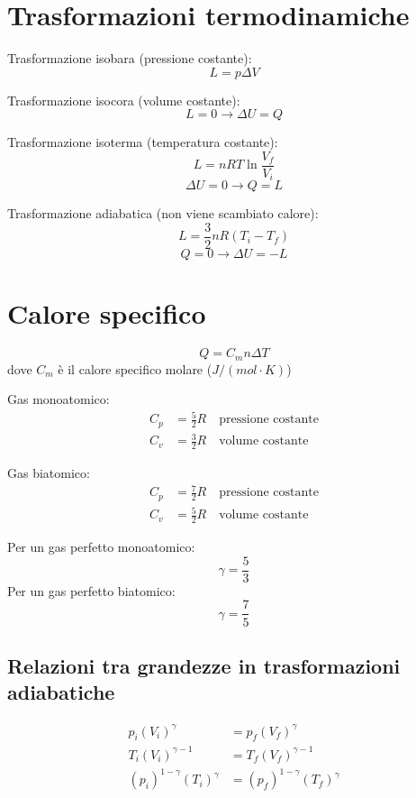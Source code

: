 \documentclass{article}
\begin{document}
\section*{Trasformazioni termodinamiche}
Trasformazione isobara (pressione costante):
$$ L = p\Delta V $$

\vspace{1em}

Trasformazione isocora (volume costante):
$$ L = 0 \longrightarrow \Delta U = Q $$

\vspace{1em}

Trasformazione isoterma (temperatura costante):
$$ L = nRT\ln{\frac{V_f}{V_i}} $$
$$ \Delta U = 0 \longrightarrow Q = L $$

\vspace{1em}

Trasformazione adiabatica (non viene scambiato calore):
$$ L = \frac{3}{2}nR(T_i - T_f) $$
$$ Q = 0 \longrightarrow \Delta U = -L $$

\section*{Calore specifico}
$$ Q = C_mn\Delta T $$
dove $C_m$ è il calore specifico molare ($J/(mol \cdot K)$)

\vspace{1em}

Gas monoatomico: 
\begin{align*}
    C_p &= \frac{5}{2}R \hspace{1em} \text{pressione costante} \\
    C_v &= \frac{3}{2}R \hspace{1em} \text{volume costante}
\end{align*}

\vspace{1em}

Gas biatomico:
\begin{align*}
    C_p &= \frac{7}{2}R \hspace{1em} \text{pressione costante} \\
    C_v &= \frac{5}{2}R \hspace{1em} \text{volume costante}
\end{align*}

Per un gas perfetto monoatomico:
$$ \gamma = \frac{5}{3} $$
Per un gas perfetto biatomico: 
$$ \gamma = \frac{7}{5} $$

\subsection*{Relazioni tra grandezze in trasformazioni adiabatiche}
\begin{align*}
    p_i(V_i)^{\gamma} &= p_f(V_f)^{\gamma} \\
    T_i(V_i)^{\gamma-1} &= T_f(V_f)^{\gamma-1} \\
    (p_i)^{1-\gamma}(T_i)^{\gamma} &= (p_f)^{1-\gamma}(T_f)^{\gamma}
\end{align*}
\end{document}

